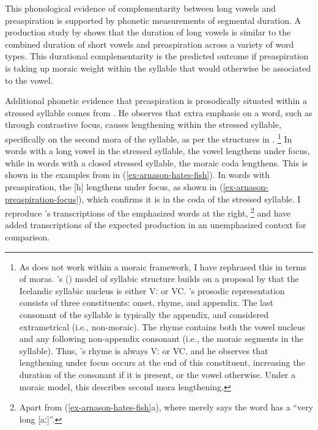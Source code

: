 \documentclass[output=paper,colorlinks,citecolor=brown]{langscibook}
\begin{document}
This phonological evidence of complementarity between long vowels and preaspiration is supported by phonetic measurements of segmental duration. A production study by \citet{garnes1976} shows that the duration of long vowels is similar to the combined duration of short vowels and preaspiration across a variety of word types. This durational complementarity is the predicted outcome if preaspiration is taking up moraic weight within the syllable that would otherwise be associated to the vowel. 

Additional phonetic evidence that preaspiration is prosodically situated within a stressed syllable comes from {\citet{arnason1986,arnason2011}}. He observes that extra emphasis on a word, such as through contrastive focus, causes lengthening within the stressed syllable, specifically on the second mora of the syllable, as per the structures in .%
\footnote{As {\citet{arnason1986,arnason2011}} does not work within a moraic framework, I have rephrased this in terms of moras. {\citeauthor{arnason2011}'s (\citeyear{arnason2011})} model of syllabic structure builds on a proposal by \citet{haugen1958} that the Icelandic syllabic nucleus is either Vː or VC. \citeauthor{arnason2011}'s prosodic representation consists of three constituents: onset, rhyme, and appendix. The last consonant of the syllable is typically the appendix, and considered extrametrical (i.e., non-moraic). The rhyme contains both the vowel nucleus and any following non-appendix consonant (i.e., the moraic segments in the syllable). Thus, \citeauthor{arnason2011}'s rhyme is always Vː or VC, and he observes that lengthening under focus occurs at the end of this constituent, increasing the duration of the consonant if it is present, or the vowel otherwise. Under a moraic model, this describes second mora lengthening.}
In words with a long vowel in the stressed syllable, the vowel lengthens under focus, while in words with a closed stressed syllable, the moraic coda lengthens. This is shown in the examples from {\citet[11--12]{arnason1986}} in (\ref{ex-arnason-hates-fish}). In words with preaspiration, the [h] lengthens under focus, as shown in (\ref{ex-arnason-preaspiration-focus}), which confirms it is in the coda of the stressed syllable. I reproduce \citeauthor{arnason1986}'s transcriptions of the emphasized words at the right,%
\footnote{Apart from (\ref{ex-arnason-hates-fish}a), where \citet{arnason1986} merely says the word has a ``very long [aː]''.}
and have added transcriptions of the expected production in an unemphasized context for comparison.
\end{document}
